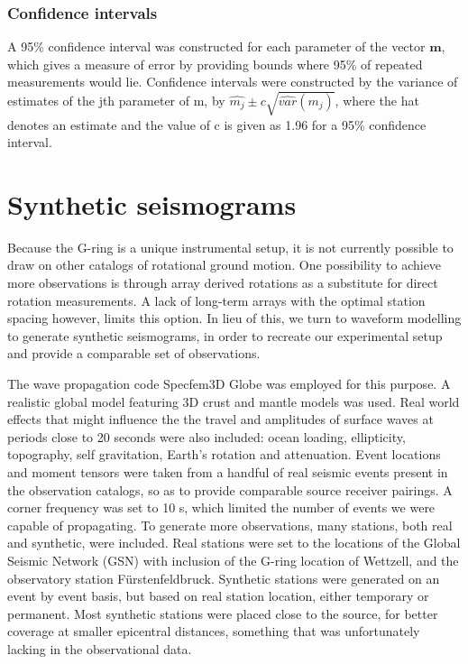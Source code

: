 \documentclass{gji}
\begin{document}
\subsubsection{Confidence intervals}
A 95\% confidence interval was constructed for each parameter of the vector $\mathbf{m}$, which gives a measure of error by providing bounds where 95\% of repeated measurements would lie. Confidence intervals were constructed by the variance of estimates of the jth parameter of m, by $\hat{m_j} \pm c \sqrt{\hat{var}(\hat{m_j})}$, where the hat denotes an estimate and the value of c is given as 1.96 for a 95\% confidence interval.

\section{Synthetic seismograms}
Because the G-ring is a unique instrumental setup, it is not currently possible to draw on other catalogs of rotational ground motion. One possibility to achieve more observations is through array derived rotations as a substitute for direct rotation measurements. A lack of long-term arrays with the optimal station spacing however,  limits this option. In lieu of this, we turn to waveform modelling to generate synthetic seismograms, in order to recreate our experimental setup and provide a comparable set of observations.

The wave propagation code Specfem3D Globe was employed for this purpose. A realistic global model featuring 3D crust and mantle models was used. Real world effects that might influence the the travel and amplitudes of surface waves at periods close to 20 seconds were also included: ocean loading, ellipticity, topography, self gravitation, Earth's rotation and attenuation. Event locations and moment tensors were taken from a handful of real seismic events present in the observation catalogs, so as to provide comparable source receiver pairings. A corner frequency was set to 10 s, which limited the number of events we were capable of propagating. To generate more observations, many stations, both real and synthetic, were included. Real stations were set to the locations of the Global Seismic Network (GSN) with inclusion of the G-ring location of Wettzell, and the observatory station F\"urstenfeldbruck. Synthetic stations were generated on an event by event basis, but based on real station location, either temporary or permanent. Most synthetic stations were placed close to the source, for better coverage at smaller epicentral distances, something that was unfortunately lacking in the observational data. 
\end{document}
